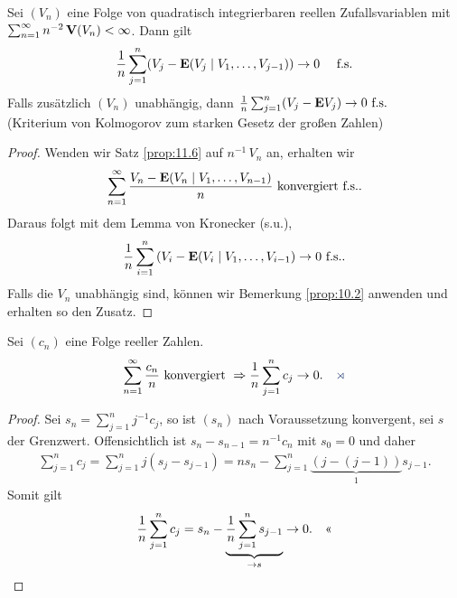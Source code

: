 \begin{prop}
\label{prop:11.7}
 Sei $(V_{n})$ eine Folge von quadratisch integrierbaren reellen
 Zufallsvariablen mit $\sum_{n=1}^\infty n^ {-2}\, \V(V_{n})< \infty$.  Dann
 gilt
 \begin{align*}
\frac{1}{n} \sum\limits^ {n}_{j=1} (V_{j}-\E(V_{j}\mid
V_{1},\ldots , V_{j-1}))\to 0 \quad \fs 
 \end{align*}
Falls zusätzlich $(V_{n})$ unabhängig, dann $\frac{1}{n} \sum^ {n}_{j=1}
(V_{j}-\E V_{j})\to 0 \fs$\\ (Kriterium von Kolmogorov zum starken Gesetz
der großen Zahlen)\fishhere
\end{prop}

\begin{proof}
Wenden wir Satz \ref{prop:11.6} auf $n^{-1}\, V_n$ an, erhalten wir
\begin{align*}
\sum_{n=1}^\infty \frac{V_n - \E(V_n\mid V_1,\ldots,V_{n-1})}{n}\text{
konvergiert f.s.}.
\end{align*}
Daraus folgt mit dem Lemma von Kronecker (s.u.),
\begin{align*}
\frac{1}{n}\sum_{i=1}^n \left(V_i - \E(V_i\mid V_1,\ldots,V_{i-1}\right) \to 0
\fs.
\end{align*}
Falls die $V_n$ unabhängig sind, können wir Bemerkung \ref{prop:10.2}
anwenden und erhalten so den Zusatz.\qedhere
\end{proof}


\begin{lem}
Sei $(c_{n})$ eine Folge reeller Zahlen.
\begin{align*}
\sum_{n=1}^\infty \frac{c_{n}}{n}\mbox{ konvergiert }\Rightarrow \frac{1}{n}
\sum\limits^ {n}_{j=1} c_{j}\to 0.\fishhere
\end{align*}
\end{lem}
\begin{proof}
Sei $s_n = \sum_{j=1}^n j^{-1} c_j$, so ist $(s_n)$ nach Voraussetzung
konvergent, sei $s$ der Grenzwert. Offensichtlich ist
$s_n-s_{n-1} = n^{-1}c_n$ mit $s_0=0$ und daher
\begin{align*}
\sum_{j=1}^n c_j = \sum_{j=1}^n j(s_j-s_{j-1}) = 
n s_n - \sum_{j=1}^n \underbrace{(j-(j-1))}_{1}s_{j-1}.
\end{align*}
Somit gilt
\begin{align*}
\frac{1}{n}\sum_{j=1}^n c_j = s_n - \underbrace{\frac{1}{n}\sum_{j=1}^n
s_{j-1}}_{\to s} \to 0.\qedhere
\end{align*}
\end{proof}

